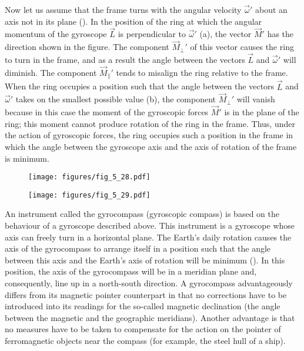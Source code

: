 Now let us assume that the frame turns with the angular velocity $\vec{\omega}'$ about an axis not in its plane (). In the position of the ring at which the angular momentum of the gyroscope $\vec{L}$ is perpendicular to $\vec{\omega}'$ (a), the vector $\vec{M}'$ has the direction shown in the figure. The component $\vec{M}_{\perp}'$ of this vector causes the ring to turn in the frame, and as a result the angle between the vectors $\vec{L}$ and $\vec{\omega}'$ will diminish. The component $\vec{M}_{\parallel}'$ tends to misalign the ring relative to the frame. When the ring occupies a position such that the angle between the vectors $\vec{L}$ and $\vec{\omega}'$ takes on the smallest possible value (b), the component $\vec{M}_{\perp}'$ will vanish because in this case the moment of the gyroscopic forces $\vec{M}'$ is in the plane of the ring; this moment cannot produce rotation of the ring in the frame. Thus, under the action of gyroscopic forces, the ring occupies such a position in the frame in which the angle between the gyroscope axis and the axis of rotation of the frame is minimum.

\begin{figure}[t]
	\begin{minipage}[t]{0.4\linewidth}
		\begin{center}
			\texttt{[image: figures/fig\_5\_28.pdf]}
			\caption[]{}
			\label{fig:5_28}
		\end{center}
	\end{minipage}
	\hspace{-0.05cm}
	\begin{minipage}[t]{0.6\linewidth}
		\begin{center}
			\texttt{[image: figures/fig\_5\_29.pdf]}
			\caption[]{}
			\label{fig:5_29}
		\end{center}
	\end{minipage}
	\vspace{-0.7cm}
\end{figure}

An instrument called the gyrocompass (gyroscopic compass) is based on the behaviour of a gyroscope described above. This instrument is a gyroscope whose axis can freely turn in a horizontal plane. The Earth's daily rotation causes the axis of the gyrocompass to arrange itself in a position such that the angle between this axis and the Earth's axis of rotation will be minimum (). In this position, the axis of the gyrocompass will be in a meridian plane and, consequently, line up in a north-south direction. A gyrocompass advantageously differs from its magnetic pointer counterpart in that no corrections have to be introduced into its readings for the so-called magnetic declination (the angle between the magnetic and the geographic meridians). Another advantage is that no measures have to be taken to compensate for the action on the pointer of ferromagnetic objects near the compass (for example, the steel hull of a ship).

